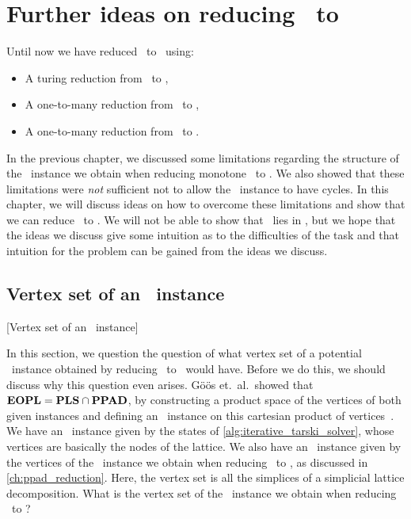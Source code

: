 \setchapterpreamble[u]{\margintoc}
\chapter{Further ideas on reducing \Tarski\ to \EOPL}\label{ch:eopl_reduction}

Until now we have reduced \Tarski\ to \EndOfLine\ using:
\begin{itemize}
	\item A turing reduction from \Tarski\ to \Tarskistar,
	\item A one-to-many reduction from \Tarskistar\ to \Sperner,
	\item A one-to-many reduction from \Sperner\ to \EndOfLine.
\end{itemize}
In the previous chapter, we discussed some limitations regarding the structure of the \Sperner\ instance we obtain when reducing monotone \Tarskistar\ to \Sperner. We also showed that these limitations were \emph{not} sufficient not to allow the \EndOfLine\ instance to have cycles. In this chapter, we will discuss ideas on how to overcome these limitations and show that we can reduce \Tarski\ to \EndOfPotentialLine\@. We will not be able to show that \Tarski\ lies in \EOPL, but we hope that the ideas we discuss give some intuition as to the difficulties of the task and that intuition for the problem can be gained from the ideas we discuss.

\section{Vertex set of an \EOPL\ instance}[Vertex set of an \EOPL\ instance]

In this section, we question the question of what vertex set of a potential \EOPL\ instance obtained by reducing \Tarskistar\ to \EndOfPotentialLine\ would have. Before we do this, we should discuss why this question even arises. Göös et.\ al.\ showed that $\textbf{EOPL} = \textbf{PLS} \cap \textbf{PPAD}$, by constructing a product space of the vertices of both given instances and defining an \EndOfPotentialLine\ instance on this cartesian product of vertices~. We have an \Localopt\ instance given by the states of \cref{alg:iterative_tarski_solver}, whose vertices are basically the nodes of the lattice. We also have an \EndOfLine\ instance given by the vertices of the \Sperner\ instance we obtain when reducing \Tarskistar\ to \Sperner, as discussed in \cref{ch:ppad_reduction}. Here, the vertex set is all the simplices of a simplicial lattice decomposition. What is the vertex set of the \EndOfPotentialLine\ instance we obtain when reducing \Tarskistar\ to \EndOfLine\@?

